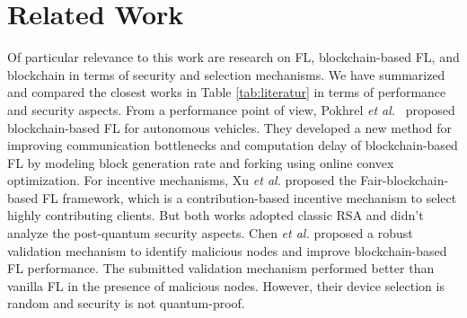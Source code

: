 \section{Related Work} \label{sec:literature_review}
Of particular relevance to this work are research
on FL, blockchain-based FL, and blockchain in terms of security and selection mechanisms.
We have summarized and compared the closest works
in Table \ref{tab:literatur}
in terms of performance and security aspects. 
From a performance point of view, Pokhrel \textit{ et al.}~\cite{pokhrelFederatedLearningBlockchain2020a} proposed blockchain-based FL for autonomous vehicles. 
They developed a new method for improving communication bottlenecks and
computation delay of blockchain-based FL
by modeling block generation rate and forking using
online convex optimization. 
For incentive mechanisms, 
Xu \textit{et al.} \cite{Rongxin} proposed the Fair-blockchain-based FL framework,
which is a contribution-based incentive mechanism to select highly contributing clients.
But both works \cite{pokhrelFederatedLearningBlockchain2020a, Rongxin}
adopted classic RSA and didn't
analyze the post-quantum security aspects.
Chen \textit{et al.} \cite{chenRobustBlockchainedFederated2021} proposed a robust
validation mechanism to identify malicious nodes and improve blockchain-based FL performance.
The submitted validation mechanism performed better than vanilla FL in the presence of malicious nodes.
However, their device selection is random and security is not quantum-proof.

